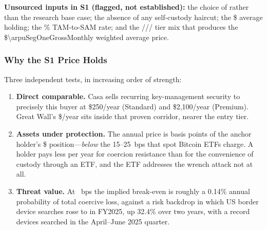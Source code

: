 \noindent\textbf{Unsourced inputs in S1 (flagged, not established):} the choice of
\numint{\tamSegOneIndividuals} rather than the  research base case; the
absence of any self-custody haircut; the \$\numint{\tamSegOneAvgHoldingUsd} average
holding; the \numint{\samPercentSegOne}\% TAM-to-SAM rate; and the
\numint{\subBasicMix}/\numint{\subMediumMix}/\numint{\subProfessionalMix}/\numint{\subGoldenMix}
tier mix that produces the \$\num{\arpuSegOneGrossMonthly} weighted average price.

\subsubsection*{Why the S1 Price Holds}

Three independent tests, in increasing order of strength:

\begin{enumerate}[nosep]
  \item \textbf{Direct comparable.} Casa sells recurring key-management security to
    precisely this buyer at \$250/year (Standard) and \$2{,}100/year
    (Premium)\cite{casa2026pricing}. Great Wall's
    \$/year sits inside that proven
    corridor, nearer the entry tier.
  \item \textbf{Assets under protection.} The annual price is
    \numint{\arpuSegOneLoadBps} basis points of the anchor holder's
    \$\numint{\tamSegOneAvgHoldingUsd} position---\emph{below} the 15--25~bps that
    spot Bitcoin ETFs charge\cite{etffees2026}. A holder pays less per year for
    coercion resistance than for the convenience of custody through an ETF, and the
    ETF addresses the wrench attack not at all.
  \item \textbf{Threat value.} At \numint{\arpuSegOneLoadBps}~bps the implied
    break-even is roughly a \num{0.14}\% annual probability of total coercive loss,
    against a risk backdrop in which US border device searches rose to
     in FY2025, up \num[round-precision=1]{32.4}\% over two years\cite{cbp2025searches},
    with a record  devices searched in the April--June 2025
    quarter\cite{fpf2025border}.
\end{enumerate}


